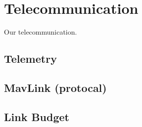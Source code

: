 \chapter{Telecommunication}\label{ch:telecommunication}
Our telecommunication.

\section{Telemetry}

\section{MavLink (protocal)}

\section{Link Budget}